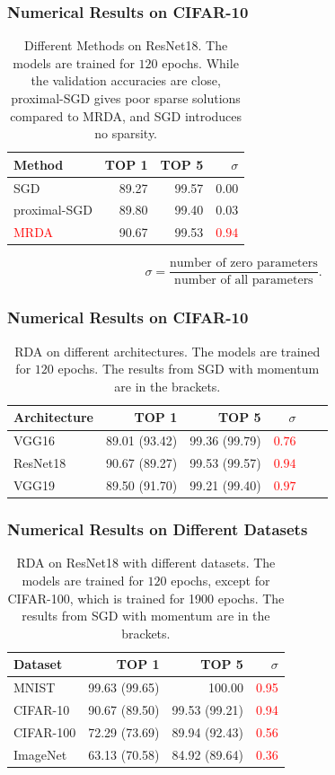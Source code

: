 \documentclass{beamer}
\newcommand{\red}[1]{\textcolor{red}{#1}}
\begin{document}
\begin{CJK*}{UTF8}{gbsn}
\begin{frame}
\frametitle{Numerical Results on CIFAR-10}
\begin{table}[H]
\centering
\caption{Different Methods on ResNet18. The models are trained for $120$ epochs. While the validation accuracies are close, proximal-SGD gives poor sparse solutions compared to MRDA, and SGD introduces no sparsity.}
\begin{tabular}{l rrr}
\hline\hline
Method & TOP 1 & TOP 5 & $\sigma$             \\ \hline
SGD    	  & 89.27 &	99.57 &	$0.00$      \\  
proximal-SGD  	  & 89.80 & 99.40 & $0.03$ \\
\red{MRDA}  	  & 90.67 &	99.53 &	\red{$0.94$}     \\  
[1ex]
\hline
\end{tabular}
\end{table}
\begin{equation}
\sigma = \frac{\text{number of zero parameters}}{\text{number of all parameters}}.
\end{equation}
\end{frame}

\begin{frame}
\frametitle{Numerical Results on CIFAR-10}
\begin{table}[H]
\centering
\caption{RDA on different architectures. The models are trained for $120$ epochs. The results from SGD with momentum are in the brackets. }
\begin{tabular}{l|rrrrr}
\hline\hline
Architecture & TOP 1 & TOP 5 & $\sigma$             \\ \hline
VGG16  	  & 89.01 (93.42) & 99.36 (99.79) & \red{$0.76$}  \\
ResNet18  & 90.67 (89.27) &	99.53 (99.57) &	\red{$0.94$}  \\
VGG19     & 89.50 (91.70) &	99.21 (99.40) &	\red{$0.97$} \\
\hline
\end{tabular}
\end{table}
\end{frame}

\begin{frame}
\frametitle{Numerical Results on Different Datasets}
\begin{table}[H]
\centering
\caption{RDA on ResNet18 with different datasets. The models are trained for $120$ epochs, except for CIFAR-100, which is trained for 1900 epochs. The results from SGD with momentum are in the brackets.}
\begin{tabular}{l rrr}
\hline\hline
Dataset & TOP 1 & TOP 5 & $\sigma$   \\ \hline
MNIST   & 99.63 (99.65) & 100.00 & \red{0.95}    \\
CIFAR-10 & 90.67 (89.50) & 99.53 (99.21) &	\red{0.94}  \\
CIFAR-100 & 72.29 (73.69) & 89.94 (92.43) & \red{0.56}  \\
ImageNet & 63.13 (70.58) & 84.92 (89.64) & \red{0.36} \\ 
\hline
\end{tabular}
\end{table}
\end{frame}


\end{CJK*}
\end{document}
